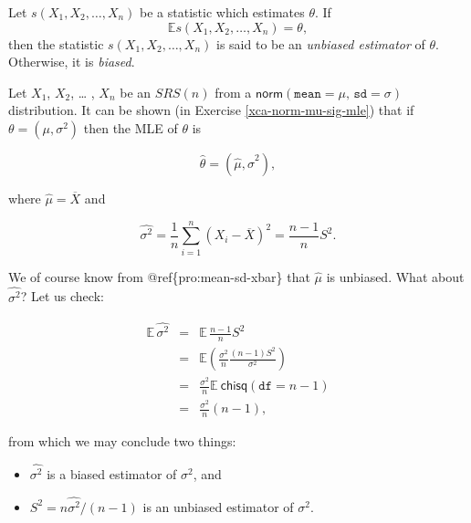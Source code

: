 \documentclass[]{book}
\providecommand{\tightlist}{%
  \setlength{\itemsep}{0pt}\setlength{\parskip}{0pt}}
\numberwithin{equation}{chapter}
\numberwithin{figure}{chapter}
\theoremstyle{plain}
\theoremstyle{definition}
\theoremstyle{remark}
\theoremstyle{definition}
\theoremstyle{definition}
\theoremstyle{remark}
\let\BeginKnitrBlock\begin \let\EndKnitrBlock\end
\begin{document}
\BeginKnitrBlock{definition}
\protect\hypertarget{def:unnamed-chunk-346}{}{\label{def:unnamed-chunk-346}}Let
\(s(X_{1},X_{2},\ldots,X_{n})\) be a statistic which estimates
\(\theta\). If \[ \mathbb{E} s(X_{1},X_{2},\ldots,X_{n})=\theta, \] then
the statistic \(s(X_{1},X_{2},\ldots,X_{n})\) is said to be an
\emph{unbiased estimator} of \(\theta\). Otherwise, it is \emph{biased}.
\EndKnitrBlock{definition}

\bigskip

\BeginKnitrBlock{example}
\protect\hypertarget{ex:normal-mle-both}{}{\label{ex:normal-mle-both}}Let
\(X_{1}\), \(X_{2}\), \ldots{} , \(X_{n}\) be an \(SRS(n)\) from a
\(\mathsf{norm}(\mathtt{mean}=\mu,\,\mathtt{sd}=\sigma)\) distribution.
It can be shown (in Exercise \ref{xca-norm-mu-sig-mle}) that if
\(\mbox{$\theta$}=(\mu,\sigma^{2})\) then the MLE of \(\theta\) is

\begin{equation}
\hat{\theta}=(\hat{\mu},\hat{\sigma}^{2}),
\end{equation}

where \(\hat{\mu}=\overline{X}\) and

\begin{equation}
\hat{\sigma^{2}}=\frac{1}{n}\sum_{i=1}^{n}\left(X_{i}-\overline{X}\right)^{2}=\frac{n-1}{n}S^{2}.
\end{equation}
\EndKnitrBlock{example}

We of course know from @ref\{pro:mean-sd-xbar\} that \(\hat{\mu}\) is
unbiased. What about \(\hat{\sigma^{2}}\)? Let us check:

\begin{eqnarray*}
\mathbb{E}\,\hat{\sigma^{2}} & = & \mathbb{E}\,\frac{n-1}{n}S^{2}\\
 & = & \mathbb{E}\left(\frac{\sigma^{2}}{n}\frac{(n-1)S^{2}}{\sigma^{2}}\right)\\
 & = & \frac{\sigma^{2}}{n}\mathbb{E}\ \mathsf{chisq}(\mathtt{df}=n-1)\\
 & = & \frac{\sigma^{2}}{n}(n-1),
\end{eqnarray*}

from which we may conclude two things:

\begin{itemize}
\tightlist
\item
  \(\hat{\sigma^{2}}\) is a biased estimator of \(\sigma^{2}\), and
\item
  \(S^{2}=n\hat{\sigma^{2}}/(n-1)\) is an unbiased estimator of
  \(\sigma^{2}\).
\end{itemize}
\end{document}
